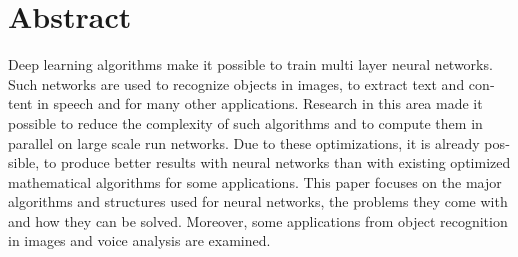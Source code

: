 \chapter{Abstract}

\begin{english} %
Deep learning algorithms make it possible to train multi layer neural networks. Such networks are used to recognize objects in images, to extract text and content in speech and for many other applications. Research in this area made it possible to reduce the complexity of such algorithms and to compute them in parallel on large scale run networks. Due to these optimizations, it is already possible, to produce better results with neural networks than with existing optimized mathematical algorithms for some applications. This paper focuses on the major algorithms and structures used for neural networks, the problems they come with and how they can be solved. Moreover, some applications from object recognition in images and voice analysis are examined.
\end{english}